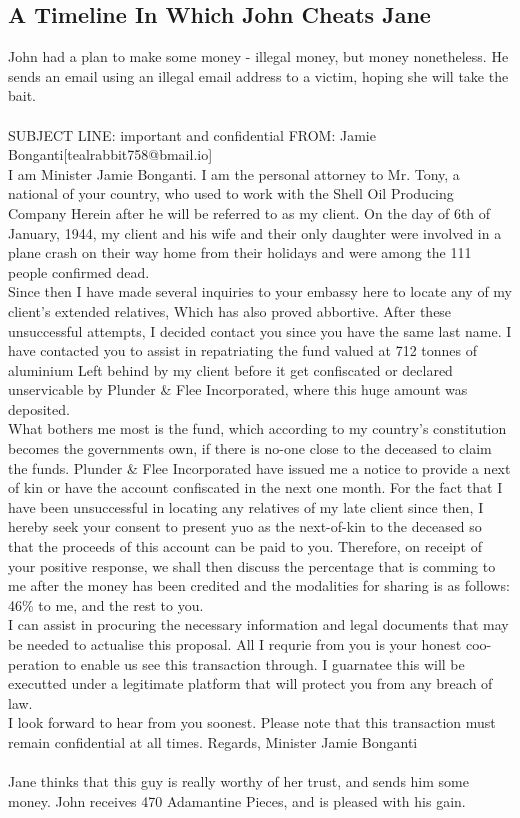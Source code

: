 \documentclass{article}
\begin{document}
\subsection{A Timeline In Which John Cheats Jane}


John had a plan to make some money {-} illegal money, but money nonetheless.
He sends an email using an illegal email address to a victim, hoping she will take the bait.
\\\\
SUBJECT LINE: important and confidential
FROM: Jamie Bonganti[tealrabbit758@bmail.io]
\\
I am Minister Jamie Bonganti.
I am the personal attorney to Mr. Tony, a national of your country, who used to work with the Shell Oil Producing Company
Herein after he will be referred to as my client.
On the day of 6th of January, 1944, my client and his wife and their only daughter were involved in a plane crash on their way home from their holidays and were among the 111 people confirmed dead.
\\
Since then I have made several inquiries to your embassy here to locate any of my client's extended relatives, Which has also proved abbortive.
After these unsuccessful attempts, I decided contact you since you have the same last name.
I have contacted you to assist in repatriating the fund valued at 712 tonnes of aluminium Left behind by my client before it get confiscated or declared unservicable by Plunder \& Flee Incorporated, where this huge amount was deposited.
\\
What bothers me most is the fund, which according to my country's constitution becomes the governments own, if there is no{-}one close to the deceased to claim the funds.
Plunder \& Flee Incorporated have issued me a notice to provide a next of kin or have the account confiscated in the next one month.
For the fact that I have been unsuccessful in locating any relatives of my late client since then, I hereby seek your consent to present yuo as the next{-}of{-}kin to the deceased so that the proceeds of this account can be paid to you.
Therefore, on receipt of your positive response, we shall then discuss the percentage that is comming to me after the money has been credited and the modalities for sharing is as follows: 46\% to me, and the rest to you.
\\
I can assist in procuring the necessary information and legal documents that may be needed to actualise this proposal.
All I requrie from you is your honest coo{-}peration to enable us see this transaction through.
I guarnatee this will be executted under a legitimate platform that will protect you from any breach of law.
\\
I look forward to hear from you soonest.
Please note that this transaction must remain confidential at all times.
Regards, Minister Jamie Bonganti
\\\\
Jane thinks that this guy is really worthy of her trust, and sends him some money.
John receives 470 Adamantine Pieces, and is pleased with his gain.
\end{document}
